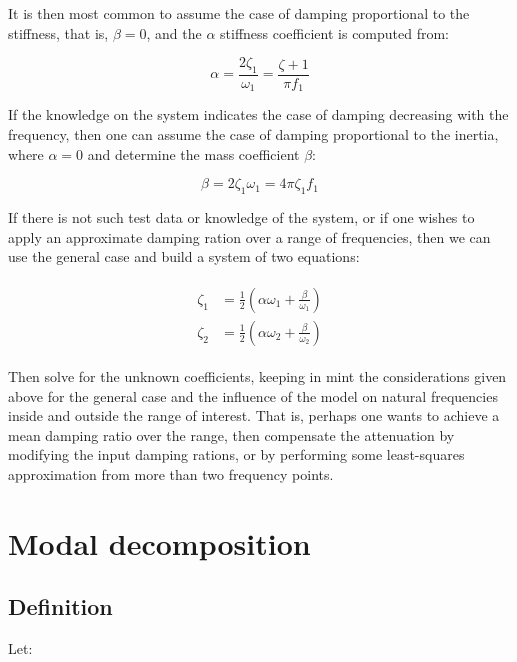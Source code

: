 \documentclass[10pt,b5paper,titlepage]{book}
\newenvironment{eqarray}
{
    \begin{eqnarray}
        \begin{aligned}
}
{
        \end{aligned}
    \end{eqnarray}
}
\begin{document}
It is then most common to assume the case of damping proportional to the stiffness,
that is, $ \beta = 0 $, and the $ \alpha $ stiffness coefficient is computed from:

\begin{equation}
    \alpha = \frac{2 \zeta_1}{\omega_1} = \frac{\zeta+1}{\pi f_1}
\end{equation}

If the knowledge on the system indicates the case of damping decreasing with the
frequency, then one can assume the case of damping proportional to the inertia,
where $ \alpha = 0 $ and determine the mass coefficient $ \beta $:

\begin{equation}
    \beta = 2 \zeta_1 \omega_1 = 4 \pi \zeta_1 f_1
\end{equation}

If there is not such test data or knowledge of the system, or if one wishes to apply
an approximate damping ration over a range of frequencies, then we can use the
general case and build a system of two equations:

\begin{eqarray}
    \zeta_1 &= \frac{1}{2} \left( \alpha \omega_1 + \frac{\beta}{\omega_1} \right)\\
    \zeta_2 &= \frac{1}{2} \left( \alpha \omega_2 + \frac{\beta}{\omega_2} \right)
\end{eqarray}

Then solve for the unknown coefficients, keeping in mint the considerations given
above for the general case and the influence of the model on natural frequencies
inside and outside the range of interest. That is, perhaps one wants to achieve
a mean damping ratio over the range, then compensate the attenuation by modifying
the input damping rations, or by performing some least-squares approximation from
more than two frequency points.







\newpage
\section{Modal decomposition}

\subsection{Definition}

Let:
\end{document}
